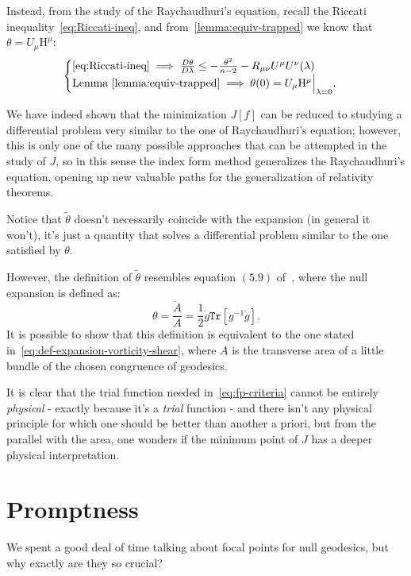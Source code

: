 	Instead, from the study of the Raychaudhuri's equation, recall the Riccati inequality~\eqref{eq:Riccati-ineq}, and from~\ref{lemma:equiv-trapped} we know that \(\theta = U_{\mu}\mathrm{H}^{\mu}\):
	\[
	\begin{cases}
	\eqref{eq:Riccati-ineq} \implies \frac{D\theta}{D\lambda} \le -\frac{\theta^2}{n - 2} - R_{\mu\nu}U^{\mu}U^{\nu}(\lambda) \\
	\text{Lemma }\ref{lemma:equiv-trapped} \implies \theta(0) = U_{\mu}\mathrm{H}^{\mu}\Big\vert_{\lambda = 0}.
	\end{cases}	
	\]
	
	We have indeed shown that the minimization \(J[f]\) can be reduced to studying a differential problem very similar to the one of Raychaudhuri's equation; however, this is only one of the many possible approaches that can be attempted in the study of \(J\), so in this sense the index form method generalizes the Raychaudhuri's equation, opening up new valuable paths for the generalization of relativity theorems.

	\begin{remark}
		Notice that \(\tilde{\theta}\) doesn't necessarily coincide with the expansion (in general it won't), it's just a quantity that solves a differential problem similar to the one satisfied by \(\theta\). 
		
		However, the definition of \(\tilde{\theta}\) resembles equation \((5.9)\) of~\cite{witten2020light}, where the null expansion is defined as:
		\[
		\theta = \frac{\dot{A}}{A} = \frac{1}{2}\dot{g}\texttt{Tr}\left[g^{-1}\dot{g}\right].
		\]
		It is possible to show that this definition is equivalent to the one stated in~\eqref{eq:def-expansion-vorticity-shear}, where \(A\) is the transverse area of a little bundle of the chosen congruence of geodesics.
		
		It is clear that the trial function needed in~\ref{eq:fp-criteria} cannot be entirely \emph{physical} - exactly because it's a \emph{trial} function - and there isn't any physical principle for which one should be better than another a priori, but from the parallel with the area, one wonders if the minimum point of \(J\) has a deeper physical interpretation.
	\end{remark}

\section{Promptness}
\label{sec:promptness}

We spent a good deal of time talking about focal points for null geodesics, but why exactly are they so crucial?

